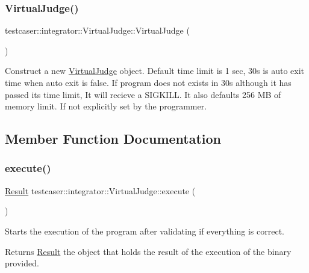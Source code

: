 \subsubsection{\texorpdfstring{VirtualJudge()}{VirtualJudge()}}
{\footnotesize\ttfamily testcaser\+::integrator\+::\+Virtual\+Judge\+::\+Virtual\+Judge (\begin{DoxyParamCaption}{ }\end{DoxyParamCaption})\hspace{0.3cm}{\ttfamily [inline]}}



Construct a new \mbox{\hyperlink{classtestcaser_1_1integrator_1_1VirtualJudge}{Virtual\+Judge}} object. Default time limit is 1 sec, 30s is auto exit time when auto exit is false. If program does not exists in 30s although it has passed its time limit, It will recieve a S\+I\+G\+K\+I\+LL. It also defaults 256 MB of memory limit. If not explicitly set by the programmer. 



\subsection{Member Function Documentation}
\mbox{\label{classtestcaser_1_1integrator_1_1VirtualJudge_ab50e9c4506fba192fd44fce0f2a21744}} 
\subsubsection{\texorpdfstring{execute()}{execute()}}
{\footnotesize\ttfamily \mbox{\hyperlink{classtestcaser_1_1integrator_1_1Result}{Result}} testcaser\+::integrator\+::\+Virtual\+Judge\+::execute (\begin{DoxyParamCaption}{ }\end{DoxyParamCaption})\hspace{0.3cm}{\ttfamily [inline]}}



Starts the execution of the program after validating if everything is correct. 

\begin{DoxyReturn}{Returns}
\mbox{\hyperlink{classtestcaser_1_1integrator_1_1Result}{Result}} the object that holds the result of the execution of the binary provided. 
\end{DoxyReturn}
\mbox{\label{classtestcaser_1_1integrator_1_1VirtualJudge_a9160dd070c63084495fe6d29cab58cb4}} 
